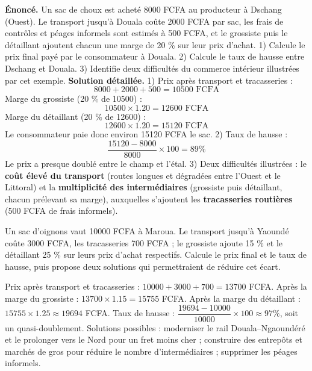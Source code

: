 \documentclass[11pt]{article}
\begin{document}
\begin{exoresolu}
\textbf{Énoncé.} Un sac de choux est acheté \num{8000} FCFA au producteur à Dschang (Ouest). Le transport jusqu'à Douala coûte \num{2000} FCFA par sac, les frais de contrôles et péages informels sont estimés à \num{500} FCFA, et le grossiste puis le détaillant ajoutent chacun une marge de \num{20} \% sur leur prix d'achat. 1) Calcule le prix final payé par le consommateur à Douala. 2) Calcule le taux de hausse entre Dschang et Douala. 3) Identifie deux difficultés du commerce intérieur illustrées par cet exemple.
\tcblower
\textbf{Solution détaillée.}
1) Prix après transport et tracasseries :
\[ 8000 + 2000 + 500 = \num{10500} \text{ FCFA} \]
Marge du grossiste (\num{20} \% de \num{10500}) :
\[ \num{10500} \times \num{1,20} = \num{12600} \text{ FCFA} \]
Marge du détaillant (\num{20} \% de \num{12600}) :
\[ \num{12600} \times \num{1,20} = \num{15120} \text{ FCFA} \]
Le consommateur paie donc environ \num{15120} FCFA le sac.
2) Taux de hausse :
\[ \frac{\num{15120} - 8000}{8000} \times 100 = \num{89} \% \]
Le prix a presque doublé entre le champ et l'étal.
3) Deux difficultés illustrées : le \textbf{coût élevé du transport} (routes longues et dégradées entre l'Ouest et le Littoral) et la \textbf{multiplicité des intermédiaires} (grossiste puis détaillant, chacun prélevant sa marge), auxquelles s'ajoutent les \textbf{tracasseries routières} (\num{500} FCFA de frais informels).
\end{exoresolu}

\begin{exercice}
Un sac d'oignons vaut \num{10000} FCFA à Maroua. Le transport jusqu'à Yaoundé coûte \num{3000} FCFA, les tracasseries \num{700} FCFA ; le grossiste ajoute \num{15} \% et le détaillant \num{25} \% sur leurs prix d'achat respectifs. Calcule le prix final et le taux de hausse, puis propose deux solutions qui permettraient de réduire cet écart.
\end{exercice}

\begin{corrige}[Exercice]
Prix après transport et tracasseries : $10000 + 3000 + 700 = \num{13700}$ FCFA. Après la marge du grossiste : $\num{13700} \times \num{1,15} = \num{15755}$ FCFA. Après la marge du détaillant : $\num{15755} \times \num{1,25} \approx \num{19694}$ FCFA. Taux de hausse : $\dfrac{\num{19694} - 10000}{10000} \times 100 \approx \num{97} \%$, soit un quasi-doublement. Solutions possibles : moderniser le rail Douala--Ngaoundéré et le prolonger vers le Nord pour un fret moins cher ; construire des entrepôts et marchés de gros pour réduire le nombre d'intermédiaires ; supprimer les péages informels.
\end{corrige}
\end{document}
